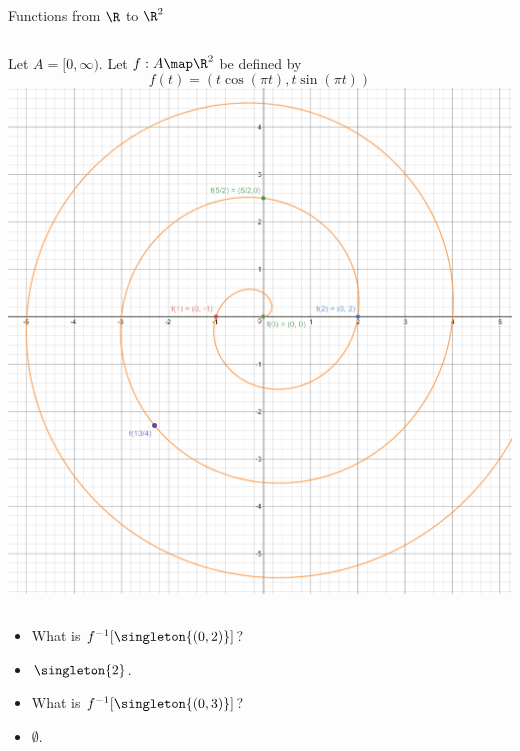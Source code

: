 \documentclass{beamer}
\begin{document}
\begin{frame}{Functions from $\R$ to $\R^2$}

\begin{columns}
\column[T]{5cm}
Let $A=[0, \infty)$. Let $f:A\map \R^2$ be defined by
$$f(t) = (t \cos(\pi t), t \sin(\pi t))$$
\column[T]{5cm}
\includegraphics[scale=0.1]{spiral}
\end{columns}

\begin{itemize}
\item What is $f^{-1}[\singleton{(0,2)}]$?
\item $\singleton{2}$.
\item What is $f^{-1}[\singleton{(0,3)}]$?
\item $\emptyset$.
\end{itemize}

\end{frame}
\end{document}
